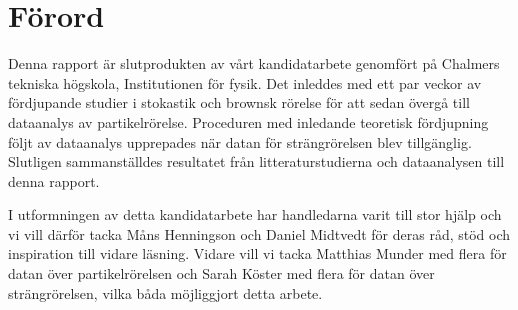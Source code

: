 \chapter*{Förord}

Denna rapport är slutprodukten av vårt kandidatarbete genomfört på Chalmers tekniska högskola, Institutionen för fysik. Det inleddes med ett par veckor av fördjupande studier i stokastik och brownsk rörelse för att sedan övergå till dataanalys av partikelrörelse. Proceduren med inledande teoretisk fördjupning följt av dataanalys upprepades när datan för strängrörelsen blev tillgänglig. Slutligen sammanställdes resultatet från litteraturstudierna och dataanalysen till denna rapport.

I utformningen av detta kandidatarbete har handledarna varit till stor hjälp och vi vill därför tacka Måns Henningson och Daniel Midtvedt för deras råd, stöd och inspiration till vidare läsning. Vidare vill vi tacka Matthias Munder med flera för datan över partikelrörelsen och Sarah Köster med flera för datan över strängrörelsen, vilka båda möjliggjort detta arbete.

